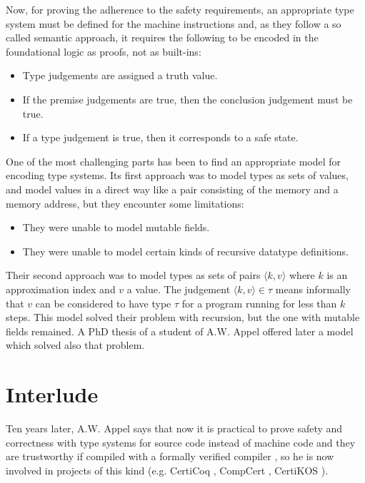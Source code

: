 \documentclass{article}
\begin{document}
Now, for proving the adherence to the safety requirements,
an appropriate type system must be defined for the machine
instructions and, as they follow a so called semantic 
approach, it requires the following to be encoded in the 
foundational logic as proofs, not as built-ins:

\begin{itemize}
  \item Type judgements are assigned a truth value.
  \item If the premise judgements are true, then the 
    conclusion judgement must be true.
  \item If a type judgement is true, then it corresponds
    to a safe state.
\end{itemize}

One of the most challenging parts has been to find an 
appropriate model for encoding type systems. Its first 
approach \cite{appel:fpcc:semantic} was to model types as 
sets of values, and model values in a direct way like a 
pair consisting of the memory and a memory address, but 
they encounter some limitations:

\begin{itemize}
  \item They were unable to model mutable fields.
  \item They were unable to model certain kinds of 
    recursive datatype definitions.
\end{itemize}

Their second approach \cite{appel:fpcc:indexed} was to 
model types as sets of pairs $\langle k, v \rangle$ where 
$k$ is an approximation index and $v$ a value. The 
judgement $\langle k, v \rangle \in \tau$ means informally 
that $v$ can be considered to have type $\tau$ for a 
program running for less than $k$ steps. This model solved 
their problem with recursion, but the one with mutable 
fields remained. A PhD thesis of a student of A.W. Appel 
offered later a model which solved also that problem. 

\section*{Interlude}

Ten years later, A.W. Appel says that now it is practical 
to prove safety and correctness with type systems for 
source code instead of machine code and they are 
trustworthy if compiled with a formally verified compiler
\cite{appel:fpcc:compilers}, so he is now involved in 
projects of this kind (e.g. CertiCoq 
\cite{website:certicoq}, CompCert \cite{website:compcert}, 
CertiKOS \cite{website:certikos}).
\end{document}

